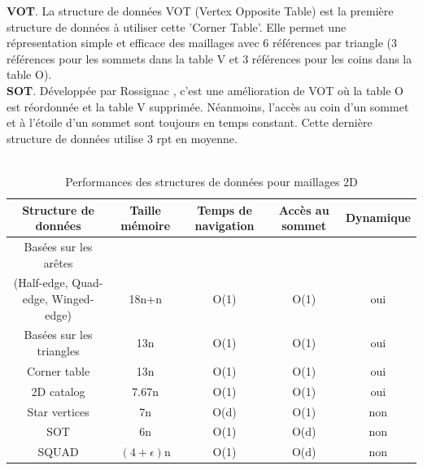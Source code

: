 \documentclass[a4paper,11pt,openany]{article}
\begin{document}
\noindent
\textbf{VOT}. La structure de données VOT (Vertex Opposite Table) est la première structure de données à utiliser cette 'Corner Table'. Elle permet une répresentation simple et efficace des maillages avec 6 références par triangle (3 références pour les sommets dans la table V et 3 références pour les coins dans la table O).\\
\textbf{SOT}. Développée par Rossignac \cite{SOT}, c'est une amélioration de VOT où la table O est réordonnée et la table V supprimée. Néanmoins, l'accès au coin d'un sommet et à l'étoile d'un sommet sont toujours en temps constant. Cette dernière structure de données utilise 3 rpt en moyenne.\\\\

\begin{table}[H]
\footnotesize
\begin{tabular}{|c | c | c | c | c|}
\hline
Structure de données & Taille mémoire & Temps de navigation & Accès au sommet & Dynamique\\
\hline
Basées sur les arêtes&&&&\\(Half-edge, Quad-edge, Winged-edge) & 18n+n & O(1) & O(1) & oui\\
Basées sur les triangles & 13n & O(1) & O(1) & oui\\		
Corner table & 13n & O(1) & O(1) & oui\\
\hline
2D catalog \cite{2d_catalog}& 7.67n & O(1) & O(1) & oui\\
\hline
Star vertices \cite{star_vertices} & 7n & O(d) & O(1) & non\\		
SOT \cite{sot}& 6n & O(1) & O(d) & non\\
SQUAD \cite{squad}& $(4+\epsilon)$n & O(1) & O(d) & non\\
\hline  
\end{tabular}
\caption{Performances des structures de données pour maillages 2D}
\end{table}

\normalsize
\end{document}
